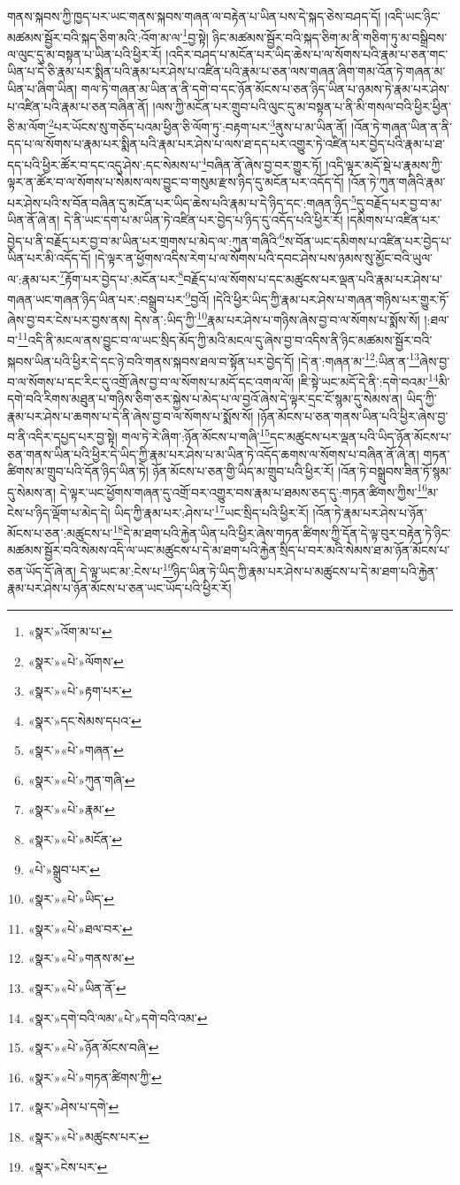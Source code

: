 གནས་སྐབས་ཀྱི་ཁྱད་པར་ཡང་གནས་སྐབས་གཞན་ལ་བརྟེན་པ་ཡིན་པས་དེ་སྐད་ཅེས་བཤད་དོ། །འདི་ཡང་ཉིང་མཚམས་སྦྱོར་བའི་སྐད་ཅིག་མའི་:འོག་མ་ལ་\footnote{«སྣར་»འོག་མ་པ་}བྱ་སྟེ། ཉིང་མཚམས་སྦྱོར་བའི་སྐད་ཅིག་མ་ནི་གཅིག་ཏུ་མ་བསྒྲིབས་ལ་ལུང་དུ་མ་བསྟན་པ་ཡིན་པའི་ཕྱིར་རོ། །འདིར་བཤད་པ་མངོན་པར་ཡིད་ཆེས་པ་ལ་སོགས་པའི་རྣམ་པ་ཅན་གང་ཡིན་པ་དེ་ཅི་རྣམ་པར་སྨིན་པའི་རྣམ་པར་ཤེས་པ་འཛིན་པའི་རྣམ་པ་ཅན་ལས་གཞན་ཞིག་གམ་འོན་ཏེ་གཞན་མ་ཡིན་པ་ཞིག་ཡིན། གལ་ཏེ་གཞན་མ་ཡིན་ན་ནི་དགེ་བ་དང་ཉོན་མོངས་པ་ཅན་ཉིད་ཡིན་པ་ཉམས་ཏེ་རྣམ་པར་ཤེས་པ་འཛིན་པའི་རྣམ་པ་ཅན་བཞིན་ནོ། །ལས་ཀྱི་མངོན་པར་གྲུབ་པའི་ལུང་དུ་མ་བསྟན་པ་ནི་མི་གསལ་བའི་ཕྱིར་ཕྱིན་ཅི་མ་ལོག་\footnote{«སྣར་»«པེ་»ལོགས་}པར་ཡོངས་སུ་གཅོད་པའམ་ཕྱིན་ཅི་ལོག་ཏུ་:བརྟག་པར་\footnote{«སྣར་»«པེ་»རྟག་པར་}ནུས་པ་མ་ཡིན་ནོ། །འོན་ཏེ་གཞན་ཡིན་ན་ནི་དད་པ་ལ་སོགས་པ་རྣམ་པར་སྨིན་པའི་རྣམ་པར་ཤེས་པ་ལས་ཐ་དད་པར་འགྱུར་ཏེ་འཛིན་པར་བྱེད་པའི་རྣམ་པ་ཐ་དད་པའི་ཕྱིར་ཚོར་བ་དང་འདུ་ཤེས་:དང་སེམས་པ་\footnote{«སྣར་»དང་སེམས་དཔའ་}བཞིན་ནོ་ཞེས་བྱ་བར་གྱུར་ཏོ། །འདི་ལྟར་མདོ་སྡེ་པ་རྣམས་ཀྱི་ལྟར་ན་ཚོར་བ་ལ་སོགས་པ་སེམས་ལས་བྱུང་བ་གསུམ་རྫས་ཉིད་དུ་མངོན་པར་འདོད་དོ། །འོན་ཏེ་ཀུན་གཞིའི་རྣམ་པར་ཤེས་པའི་ས་བོན་བཞིན་དུ་མངོན་པར་ཡིད་ཆེས་པའི་རྣམ་པ་དེ་ཉིད་དང་:གཞན་ཉིད་\footnote{«སྣར་»«པེ་»གཞན་}དུ་བརྗོད་པར་བྱ་བ་མ་ཡིན་ནོ་ཞེ་ན། དེ་ནི་ཡང་དག་པ་མ་ཡིན་ཏེ་འཛིན་པར་བྱེད་པ་ཉིད་དུ་འདོད་པའི་ཕྱིར་རོ། །དམིགས་པ་འཛིན་པར་བྱེད་པ་ནི་བརྗོད་པར་བྱ་བ་མ་ཡིན་པར་གྲགས་པ་མེད་ལ་:ཀུན་གཞིའི་\footnote{«སྣར་»«པེ་»ཀུན་གཞི་}ས་བོན་ཡང་དམིགས་པ་འཛིན་པར་བྱེད་པ་ཡིན་པར་མི་འདོད་དོ། །དེ་ལྟར་ན་ཕྱོགས་འདིས་རེག་པ་ལ་སོགས་པའི་དབང་ཤེས་པས་ཉམས་སུ་མྱོང་བའི་ཡུལ་ལ་:རྣམ་པར་\footnote{«སྣར་»«པེ་»རྣམ་}རྟོག་པར་བྱེད་པ་:མངོན་པར་\footnote{«སྣར་»«པེ་»མངོན་}བརྗོད་པ་ལ་སོགས་པ་དང་མཚུངས་པར་ལྡན་པའི་རྣམ་པར་ཤེས་པ་གཞན་ཡང་གཞན་ཉིད་ཡིན་པར་:བསྒྲུབ་པར་\footnote{«པེ་»སྒྲུབ་པར་}བྱའོ། །དེའི་ཕྱིར་ཡིད་ཀྱི་རྣམ་པར་ཤེས་པ་གཞན་གཉིས་པར་གྱུར་ཏོ་ཞེས་བྱ་བར་ངེས་པར་བྱས་ནས། དེས་ན་:ཡིད་ཀྱི་\footnote{«སྣར་»«པེ་»ཡིད་}རྣམ་པར་ཤེས་པ་གཉིས་ཞེས་བྱ་བ་ལ་སོགས་པ་སྨོས་སོ། །:ཐལ་བ་\footnote{«སྣར་»«པེ་»ཐལ་བར་}འདི་ནི་མངལ་ནས་བྱུང་བ་ལ་ཡང་སྲིད་མོད་ཀྱི་མའི་མངལ་དུ་ཞེས་བྱ་བ་འདིས་ནི་ཉིང་མཚམས་སྦྱོར་བའི་སྐབས་ཡིན་པའི་ཕྱིར་དེ་དང་ཉེ་བའི་གནས་སྐབས་ཐལ་བ་སྟོན་པར་བྱེད་དོ། །དེ་ན་:གཞན་མ་\footnote{«སྣར་»«པེ་»གནས་མ་}:ཡིན་ན་\footnote{«སྣར་»«པེ་»ཡིན་ནོ་}ཞེས་བྱ་བ་ལ་སོགས་པ་དང་རིང་དུ་འགྲོ་ཞེས་བྱ་བ་ལ་སོགས་པ་མདོ་དང་འགལ་ལོ། །ཇི་སྟེ་ཡང་མདོ་དེ་ནི་:དགེ་བའམ་\footnote{«སྣར་»དགེ་བའི་ལམ་«པེ་»དགེ་བའི་འམ་}མི་དགེ་བའི་རིགས་མཐུན་པ་གཉིས་ཅིག་ཅར་སྐྱེས་པ་མེད་པ་ལ་བྱའོ་ཞེས་དེ་ལྟར་དྲང་ངོ་སྙམ་དུ་སེམས་ན། ཡིད་ཀྱི་རྣམ་པར་ཤེས་པ་ཆགས་པ་དེ་ནི་ཞེས་བྱ་བ་ལ་སོགས་པ་སྨོས་སོ། །ཉོན་མོངས་པ་ཅན་གནས་ཡིན་པའི་ཕྱིར་ཞེས་བྱ་བ་ནི་འདིར་དཔྱད་པར་བྱ་སྟེ། གལ་ཏེ་རེ་ཞིག་:ཉོན་མོངས་པ་གཞི་\footnote{«སྣར་»«པེ་»ཉོན་མོངས་བཞི་}དང་མཚུངས་པར་ལྡན་པའི་ཡིད་ཉོན་མོངས་པ་ཅན་གནས་ཡིན་པའི་ཕྱིར་དེ་ཡིད་ཀྱི་རྣམ་པར་ཤེས་པ་མ་ཡིན་ཏེ་འདོད་ཆགས་ལ་སོགས་པ་བཞིན་ནོ་ཞེ་ན། གཏན་ཚིགས་མ་གྲུབ་པའི་དོན་ཉིད་ཡིན་ཏེ། ཉོན་མོངས་པ་ཅན་གྱི་ཡིད་མ་གྲུབ་པའི་ཕྱིར་རོ། །འོན་ཏེ་བསྒྲུབས་ཟིན་ཏོ་སྙམ་དུ་སེམས་ན། དེ་ལྟར་ཡང་ཕྱོགས་གཞན་དུ་འགྲོ་བར་འགྱུར་བས་རྣམ་པ་ཐམས་ཅད་དུ་:གཏན་ཚིགས་ཀྱིས་\footnote{«སྣར་»«པེ་»གཏན་ཚིགས་ཀྱི་}མ་ངེས་པ་ཉིད་ལྡོག་པ་མེད་དེ། ཡིད་ཀྱི་རྣམ་པར་:ཤེས་པ་\footnote{«སྣར་»ཤེས་པ་དགེ་}ཡང་སྲིད་པའི་ཕྱིར་རོ། །འོན་ཏེ་རྣམ་པར་ཤེས་པ་ཉོན་མོངས་པ་ཅན་:མཚུངས་པ་\footnote{«སྣར་»«པེ་»མཚུངས་པར་}དེ་མ་ཐག་པའི་རྐྱེན་ཡིན་པའི་ཕྱིར་ཞེས་གཏན་ཚིགས་ཀྱི་དོན་དེ་ལྟ་བུར་བརྟེན་ཏེ་ཉིང་མཚམས་སྦྱོར་བའི་སེམས་འདི་ལ་ཡང་མཚུངས་པ་དེ་མ་ཐག་པའི་རྐྱེན་སྲིད་པ་བར་མའི་སེམས་ཐ་མ་ཉོན་མོངས་པ་ཅན་ཡོད་དོ་ཞེ་ན། དེ་ལྟ་ཡང་མ་:ངེས་པ་\footnote{«སྣར་»ངེས་པར་}ཉིད་ཡིན་ཏེ་ཡིད་ཀྱི་རྣམ་པར་ཤེས་པ་མཚུངས་པ་དེ་མ་ཐག་པའི་རྐྱེན་རྣམ་པར་ཤེས་པ་ཉོན་མོངས་པ་ཅན་ཡང་ཡོད་པའི་ཕྱིར་རོ། 